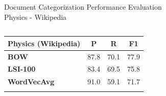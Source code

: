 \documentclass[10pt]{beamer}
\begin{document}
\begin{frame}{Document Categorization Performance Evaluation \\ Physics - Wikipedia }
\begin{columns}[T]
	\hspace{5mm}
	\begin{column}{.4\textwidth}
		\begin{table}[h!]
		\tabcolsep=0.1cm
		\scriptsize
		\begin{center}
		\begin{tabular}{l@{\hskip5mm} c c@{\hskip4mm} c}
		\toprule
		\textbf{Physics (Wikipedia)} & {P} & {R} & \textbf{F1} \\
		\midrule
		\textbf{BOW}
		& 87.8   & 70.1  & 77.9 \\
		\textbf{LSI-100}
		& 83.4   & 69.5  & 75.8 \\
		\textbf{WordVecAvg}
		& 91.0   & 59.1  & 71.7 \\ \addlinespace[1mm]


\end{tabular}
\end{center}
\end{table}
\end{column}
\end{columns}
\end{frame}
\end{document}
